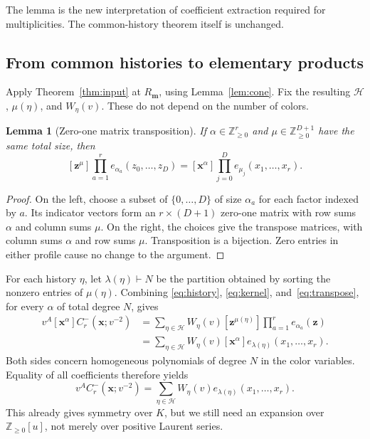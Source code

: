 \documentclass[11pt,reqno]{amsart}
\newcommand{\NN}{\mathbb Z_{\geq0}}
\newcommand{\xx}{\mathbf x}
\newcommand{\zz}{\mathbf z}
\newcommand{\mm}{\mathbf m}
\newcommand{\HH}{\mathcal H}
\newtheorem{lemma}[theorem]{Lemma}
\theoremstyle{definition}
\theoremstyle{remark}
\numberwithin{equation}{section}
\begin{document}
The lemma is the new interpretation of coefficient extraction required
for multiplicities.  The common-history theorem itself is unchanged.

\subsection{From common histories to elementary products}
Apply Theorem~\ref{thm:input} at $R_{\mm}$, using
Lemma~\ref{lem:cone}.  Fix the resulting $\HH$, $\mu(\eta)$, and
$W_\eta(v)$.  These do not depend on the number of colors.

\begin{lemma}[Zero-one matrix transposition]\label{lem:transpose}
If $\alpha\in\NN^r$ and $\mu\in\NN^{D+1}$ have the same total size,
then
\begin{equation}\label{eq:transpose}
 [\zz^\mu]\prod_{a=1}^r e_{\alpha_a}(z_0,\ldots,z_D)
 = [\xx^\alpha]\prod_{j=0}^D e_{\mu_j}(x_1,\ldots,x_r).
\end{equation}
\end{lemma}
\begin{proof}
On the left, choose a subset of $\{0,\ldots,D\}$ of size $\alpha_a$
for each factor indexed by $a$.  Its indicator vectors form an
$r\times(D+1)$ zero-one matrix with row sums $\alpha$ and column sums
$\mu$.  On the right, the choices give the transpose matrices, with
column sums $\alpha$ and row sums $\mu$.  Transposition is a bijection.
Zero entries in either profile cause no change to the argument.
\end{proof}

For each history $\eta$, let $\lambda(\eta)\vdash N$ be the partition
obtained by sorting the nonzero entries of $\mu(\eta)$.  Combining
\eqref{eq:history}, \eqref{eq:kernel}, and~\eqref{eq:transpose}, for
every $\alpha$ of total degree $N$, gives
\begin{align*}
 v^A[\xx^\alpha]C^-_r(\xx;v^{-2})
 &=\sum_{\eta\in\HH}W_\eta(v)
          [\zz^{\mu(\eta)}]\prod_{a=1}^r e_{\alpha_a}(\zz)\\
 &=\sum_{\eta\in\HH}W_\eta(v)
          [\xx^\alpha]e_{\lambda(\eta)}(x_1,\ldots,x_r).
\end{align*}
Both sides concern homogeneous polynomials of degree $N$ in the color
variables.  Equality of all coefficients therefore yields
\begin{equation}\label{eq:laurent-expansion}
 v^A C^-_r(\xx;v^{-2})
    =\sum_{\eta\in\HH}W_\eta(v)e_{\lambda(\eta)}(x_1,\ldots,x_r).
\end{equation}
This already gives symmetry over $K$, but we still need an expansion
over $\mathbb Z_{\geq0}[u]$, not merely over positive Laurent series.
\end{document}
